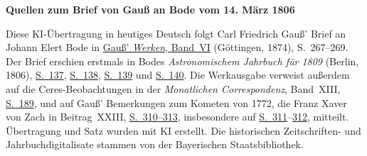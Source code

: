 \clearpage\thispagestyle{empty}
\begin{center}\textbf{Quellen zum Brief von Gauß an Bode vom 14. März 1806}\end{center}
\noindent Diese KI-Übertragung in heutiges Deutsch folgt Carl Friedrich Gauß’ Brief an Johann Elert Bode in \href{https://gdz.sub.uni-goettingen.de/id/PPN236007467}{Gauß’ \textit{Werken}, Band~VI} (Göttingen, 1874), S.~267--269. Der Brief erschien erstmals in Bodes \textit{Astronomischem Jahrbuch für 1809} (Berlin, 1806), \href{https://www.digitale-sammlungen.de/en/view/bsb10538338?page=147}{S.~137}, \href{https://www.digitale-sammlungen.de/en/view/bsb10538338?page=148}{S.~138}, \href{https://www.digitale-sammlungen.de/en/view/bsb10538338?page=149}{S.~139} und \href{https://www.digitale-sammlungen.de/en/view/bsb10538338?page=150}{S.~140}. Die Werkausgabe verweist außerdem auf die Ceres-Beobachtungen in der \textit{Monatlichen Correspondenz}, Band~XIII, \href{https://www.digitale-sammlungen.de/en/view/bsb10538605?page=197}{S.~189}, und auf Gauß’ Bemerkungen zum Kometen von 1772, die Franz Xaver von Zach in Beitrag~XXIII, \href{https://www.digitale-sammlungen.de/en/view/bsb10538605?page=320}{S.~310--313}, insbesondere auf \href{https://www.digitale-sammlungen.de/en/view/bsb10538605?page=321}{S.~311}--\href{https://www.digitale-sammlungen.de/en/view/bsb10538605?page=322}{312}, mitteilt. Übertragung und Satz wurden mit KI erstellt. Die historischen Zeitschriften- und Jahrbuchdigitalisate stammen von der Bayerischen Staatsbibliothek.
\clearpage
